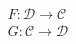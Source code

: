 \documentclass{ctexart}
\begin{document}
\begin{align*}
F:\mathcal{D}\to\mathcal{C}\\
G:\mathcal{C}\to\mathcal{D}
\end{align*}
\end{document}
